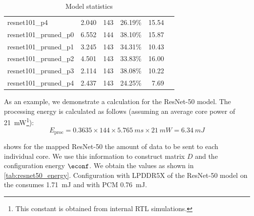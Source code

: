 \begin{table}[hbtp]
\begin{tabular}{@{}lrrrrr@{}}
resnet101\_p4           & 2.040                                                           & 143            & 26.19\%            & 15.54                                                             \\
resnet101\_pruned\_p0   & 6.552                                                           & 144            & 38.10\%            & 15.87                                                             \\
resnet101\_pruned\_p1   & 3.245                                                           & 143            & 34.31\%            & 10.43                                                             \\
resnet101\_pruned\_p2   & 4.501                                                           & 143            & 33.83\%            & 16.00                                                             \\
resnet101\_pruned\_p3   & 2.114                                                           & 143            & 38.08\%            & 10.22                                                             \\
resnet101\_pruned\_p4   & 2.437                                                           & 143            & 24.25\%            & 7.69                                                              \\
\bottomrule
\end{tabular}
\caption{Model statistics}
\label{tab:example_models_stats}
\end{table}

As an example, we demonstrate a calculation for the ResNet-50 model.
The processing energy is calculated as follows (assuming an average core power of \SI{21}{mW}\footnote{This constant is obtained from internal RTL simulations.}):
\begin{equation}
    E_\textrm{proc} = 0.3635 \times 144 \times \SI{5.765}{ms} \times \SI{21}{mW} = \SI{6.34}{mJ}
\end{equation}

 shows for the mapped ResNet-50 the amount of data to be sent to each individual core.
We use this information to construct matrix $D$ and the configuration energy $\econf$.
We obtain the values as shown in \cref{tab:resnet50_energy}.
Configuration with LPDDR5X of the ResNet-50 model on the \graicore{} consumes \SI{1.71}{mJ} and with PCM \SI{0.76}{mJ}.

